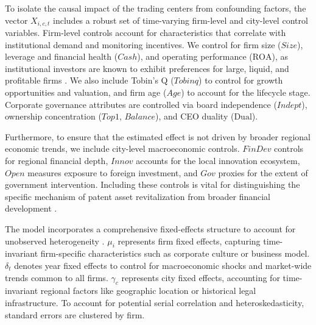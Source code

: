 \documentclass[12pt,a4paper]{article}
\begin{document}
To isolate the causal impact of the trading centers from confounding factors, the vector $X_{i,c,t}$ includes a robust set of time-varying firm-level and city-level control variables. Firm-level controls account for characteristics that correlate with institutional demand and monitoring incentives. We control for firm size ($Size$), leverage and financial health ($Cash$), and operating performance ($\text{ROA}$), as institutional investors are known to exhibit preferences for large, liquid, and profitable firms \citep{mccahery2016behind}. We also include Tobin’s Q ($Tobinq$) to control for growth opportunities and valuation, and firm age ($Age$) to account for the lifecycle stage. Corporate governance attributes are controlled via board independence ($Indept$), ownership concentration ($Top1$, $Balance$), and CEO duality ($\text{Dual}$).

Furthermore, to ensure that the estimated effect is not driven by broader regional economic trends, we include city-level macroeconomic controls. $FinDev$ controls for regional financial depth, $Innov$ accounts for the local innovation ecosystem, $Open$ measures exposure to foreign investment, and $Gov$ proxies for the extent of government intervention. Including these controls is vital for distinguishing the specific mechanism of patent asset revitalization from broader financial development \citep{fang2017intellectual}.

The model incorporates a comprehensive fixed-effects structure to account for unobserved heterogeneity \citep{gormley2014common}. $\mu_i$ represents firm fixed effects, capturing time-invariant firm-specific characteristics such as corporate culture or business model. $\delta_t$ denotes year fixed effects to control for macroeconomic shocks and market-wide trends common to all firms. $\gamma_c$ represents city fixed effects, accounting for time-invariant regional factors like geographic location or historical legal infrastructure. To account for potential serial correlation and heteroskedasticity, standard errors are clustered by firm.
\end{document}
